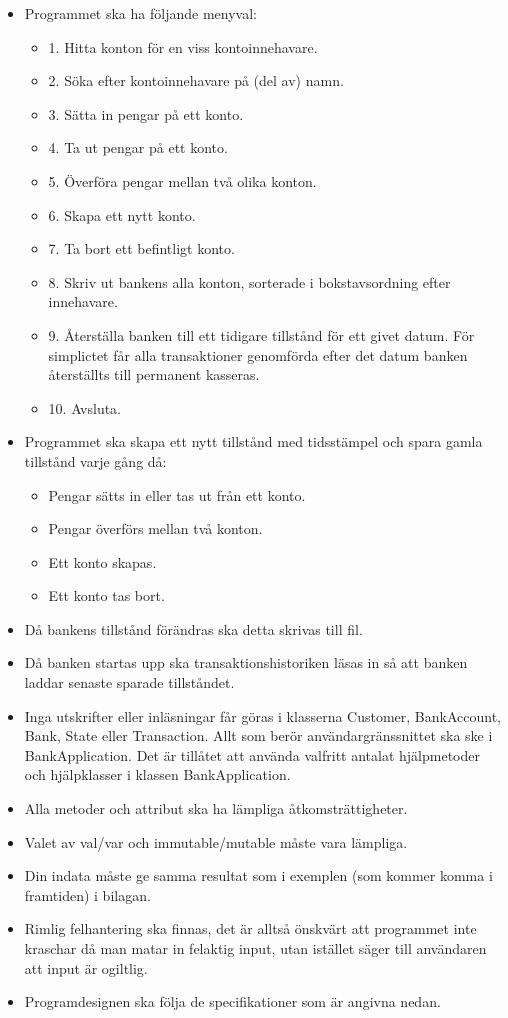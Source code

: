 \begin{itemize}
\item Programmet ska ha följande menyval:

\begin{itemize}
\item 1. Hitta konton för en viss kontoinnehavare.
\item 2. Söka efter kontoinnehavare på (del av) namn.
\item 3. Sätta in pengar på ett konto.
\item 4. Ta ut pengar på ett konto.
\item 5. Överföra pengar mellan två olika konton.
\item 6. Skapa ett nytt konto.
\item 7. Ta bort ett befintligt konto.
\item 8. Skriv ut bankens alla konton, sorterade i bokstavsordning efter innehavare.
\item 9. Återställa banken till ett tidigare tillstånd för ett givet datum. För simplictet får alla transaktioner genomförda efter det datum banken återställts till permanent kasseras. 
\item 10. Avsluta.
\end{itemize}

\item Programmet ska skapa ett nytt tillstånd med tidsstämpel och spara gamla tillstånd varje gång då:
\begin{itemize}
\item Pengar sätts in eller tas ut från ett konto.
\item Pengar överförs mellan två konton.
\item Ett konto skapas.
\item Ett konto tas bort.
\end{itemize}
\item Då bankens tillstånd förändras ska detta skrivas till fil.
\item Då banken startas upp ska transaktionshistoriken läsas in så att banken laddar senaste sparade tillståndet.
\item Inga utskrifter eller inläsningar får göras i klasserna Customer, BankAccount, Bank, State eller Transaction. Allt som berör användargränssnittet ska ske i BankApplication. Det är tillåtet att använda valfritt antalat hjälpmetoder och hjälpklasser i klassen BankApplication.
\item Alla metoder och attribut ska ha lämpliga åtkomsträttigheter.
\item Valet av val/var och immutable/mutable måste vara lämpliga.
\item Din indata måste ge samma resultat som i exemplen (som kommer komma i framtiden) i bilagan.
\item Rimlig felhantering ska finnas, det är alltså önskvärt att programmet inte kraschar då man matar in felaktig input, utan istället säger till användaren att input är ogiltlig.
\item Programdesignen ska följa de specifikationer som är angivna nedan.
\end{itemize}

